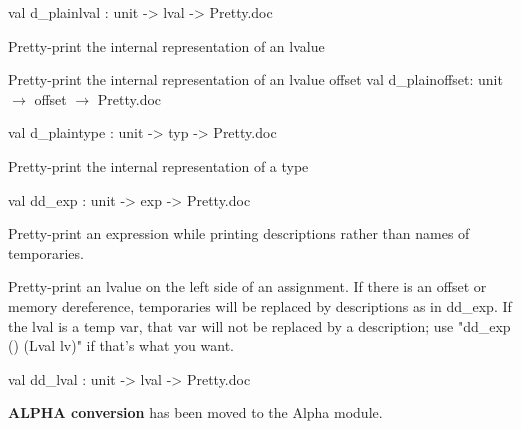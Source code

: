 \documentclass[11pt]{article}
\begin{document}
\label{val:Cil.d-underscoreplainlval}\begin{ocamldoccode}
val d_plainlval : unit -> lval -> Pretty.doc
\end{ocamldoccode}
\begin{ocamldocdescription}
Pretty-print the internal representation of an lvalue


\end{ocamldocdescription}




Pretty-print the internal representation of an lvalue offset 
val d\_plainoffset: unit $\rightarrow$ offset $\rightarrow$ Pretty.doc



\label{val:Cil.d-underscoreplaintype}\begin{ocamldoccode}
val d_plaintype : unit -> typ -> Pretty.doc
\end{ocamldoccode}
\begin{ocamldocdescription}
Pretty-print the internal representation of a type


\end{ocamldocdescription}




\label{val:Cil.dd-underscoreexp}\begin{ocamldoccode}
val dd_exp : unit -> exp -> Pretty.doc
\end{ocamldoccode}
\begin{ocamldocdescription}
Pretty-print an expression while printing descriptions rather than names
  of temporaries.

Pretty-print an lvalue on the left side of an assignment.
    If there is an offset or memory dereference, temporaries will
    be replaced by descriptions as in dd\_exp.  If the lval is a temp var,
    that var will not be replaced by a description; use "dd\_exp () (Lval lv)"
    if that's what you want.


\end{ocamldocdescription}




\label{val:Cil.dd-underscorelval}\begin{ocamldoccode}
val dd_lval : unit -> lval -> Pretty.doc
\end{ocamldoccode}




{\bf ALPHA conversion} has been moved to the Alpha module.
\end{document}
